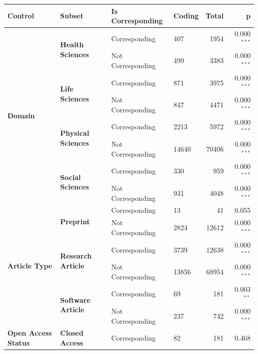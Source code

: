\documentclass[
  letterpaper,
  DIV=11,
  numbers=noendperiod]{scrartcl}
\begin{document}
\begin{table}
{\begin{tabular}{llllrr}
\toprule
\textbf{Control} & \textbf{Subset} & \textbf{Is Corresponding} & \textbf{Coding} & \textbf{Total} & \textbf{p} \\
\midrule
    \multirow{8}{*}{\textbf{Domain}} & \multirow{2}{*}{\textbf{Health Sciences}} & Corresponding & 407 & 1954 & 0.000$^{***}$ \\
    & & \cellcolor{gray!10}Not Corresponding & \cellcolor{gray!10}499 & \cellcolor{gray!10}3383 & \cellcolor{gray!10}0.000$^{***}$ \\
    & \multirow{2}{*}{\textbf{Life Sciences}} & Corresponding & 871 & 3975 & 0.000$^{***}$ \\
    & & \cellcolor{gray!10}Not Corresponding & \cellcolor{gray!10}847 & \cellcolor{gray!10}4471 & \cellcolor{gray!10}0.000$^{***}$ \\
    & \multirow{2}{*}{\textbf{Physical Sciences}} & Corresponding & 2213 & 5972 & 0.000$^{***}$ \\
    & & \cellcolor{gray!10}Not Corresponding & \cellcolor{gray!10}14640 & \cellcolor{gray!10}70406 & \cellcolor{gray!10}0.000$^{***}$ \\
    & \multirow{2}{*}{\textbf{Social Sciences}} & Corresponding & 330 & 959 & 0.000$^{***}$ \\
    & & \cellcolor{gray!10}Not Corresponding & \cellcolor{gray!10}931 & \cellcolor{gray!10}4048 & \cellcolor{gray!10}0.000$^{***}$ \\
    \midrule
    \multirow{6}{*}{\textbf{Article Type}} & \multirow{2}{*}{\textbf{Preprint}} & Corresponding & 13 & 41 & 0.055 \\
    & & \cellcolor{gray!10}Not Corresponding & \cellcolor{gray!10}2824 & \cellcolor{gray!10}12612 & \cellcolor{gray!10}0.000$^{***}$ \\
    & \multirow{2}{*}{\textbf{Research Article}} & Corresponding & 3739 & 12638 & 0.000$^{***}$ \\
    & & \cellcolor{gray!10}Not Corresponding & \cellcolor{gray!10}13856 & \cellcolor{gray!10}68954 & \cellcolor{gray!10}0.000$^{***}$ \\
    & \multirow{2}{*}{\textbf{Software Article}} & Corresponding & 69 & 181 & 0.003$^{**}$ \\
    & & \cellcolor{gray!10}Not Corresponding & \cellcolor{gray!10}237 & \cellcolor{gray!10}742 & \cellcolor{gray!10}0.000$^{***}$ \\
    \midrule
    \multirow{4}{*}{\textbf{Open Access Status}} & \multirow{2}{*}{\textbf{Closed Access}} & Corresponding & 82 & 181 & 0.468 \\

\end{tabular}}
\end{table}
\end{document}

